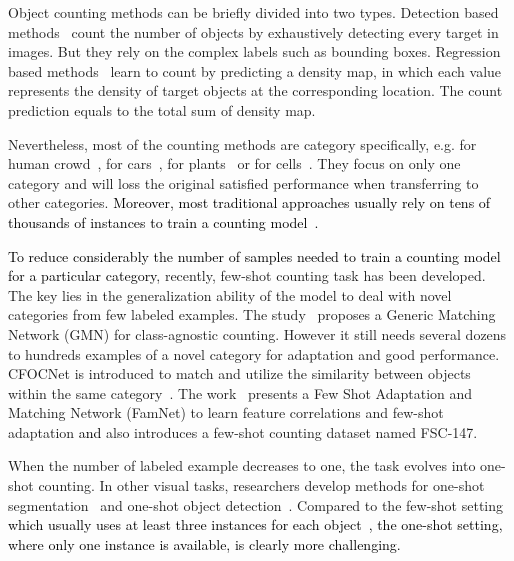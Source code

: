 \documentclass{article}
\newcommand\hui[1]{\textcolor{black}{#1}}
\newcommand\XP[1]{\textcolor{black}{#1}}\newcommand\XPC[1]{\textcolor{black}{[#1]}}
\begin{document}
Object counting methods can be briefly divided into two types. Detection based methods~\cite{chattopadhyay2017counting} count the number of objects by exhaustively detecting every target in images. But they rely on the complex labels such as bounding boxes. Regression based methods~\cite{zhang2016single, ma2019bayesian} learn to count by predicting a density map, in which each value represents the density of target objects at the corresponding location. The count prediction equals to the total sum of density map.

Nevertheless, most of the counting methods are category specifically, e.g. for human crowd~\cite{zhang2016single, ma2019bayesian, cao2018scale, liu2019context, wang2020distribution, lin2021direct}, for cars~\cite{biswas2017automatic, moranduzzo2013automatic}, for plants~\cite{machefer2020mask} or for cells~\cite{falk2019u, xie2018microscopy}. They focus on only one category and will loss the original satisfied performance when transferring to other categories. \XP{Moreover, most traditional approaches usually rely on tens of thousands of instances to train a counting model~\cite{ma2019bayesian, cao2018scale, liu2019context, lin2021direct, biswas2017automatic, moranduzzo2013automatic}.} 

\XP{To reduce considerably the number of samples needed to train a counting model} \hui{for a particular category}, recently, few-shot counting task has been developed. The key lies in the generalization ability of the model to deal with novel categories from few labeled examples. The study~\cite{lu2018class} proposes a Generic Matching Network (GMN) for class-agnostic counting. However it still needs several dozens to hundreds examples of a novel category for adaptation and good performance. CFOCNet is introduced to match and utilize the similarity between objects within the same category~\cite{yang2021class}. The work~\cite{ranjan2021learning} presents a Few Shot Adaptation and Matching Network (FamNet) to learn feature correlations and few-shot adaptation \XP{and} also introduces a few-shot counting dataset named FSC-147.

When the number of labeled example decreases to one, the task evolves into one-shot counting. In other visual tasks, researchers develop methods for one-shot segmentation~\cite{michaelis2018one} and one-shot object detection~\cite{hsieh2019one, li2020one}. Compared to the few-shot setting \XP{which usually uses at least three instances for each object~\cite{ranjan2021learning}, the one-shot setting, where only one instance is available, is clearly more challenging.} 
\end{document}

